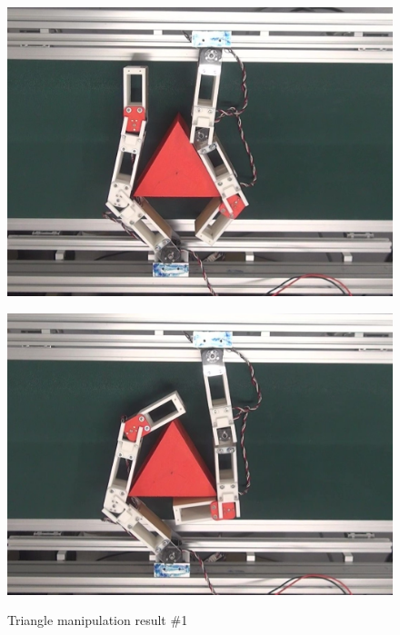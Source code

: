 \documentclass[a4paper,twoside,12pt,papersize, dvipdfmx]{iirthesis}
\begin{document}
\begin{figure}[b]
\begin{minipage}{0.249\hsize}
\includegraphics[width=0.98\hsize]{fig/4-manipulation-result/Triangle/1-3.jpg}
\subcaption{}\label{}
\end{minipage}\hfill
\begin{minipage}{0.249\hsize}
\centering
\includegraphics[width=0.98\hsize]{fig/4-manipulation-result/Triangle/1-4.jpg}
\subcaption{}\label{}
\end{minipage}
\caption{Triangle manipulation result \#1}\label{fig::result::trim1}


\end{figure}
\end{document}
